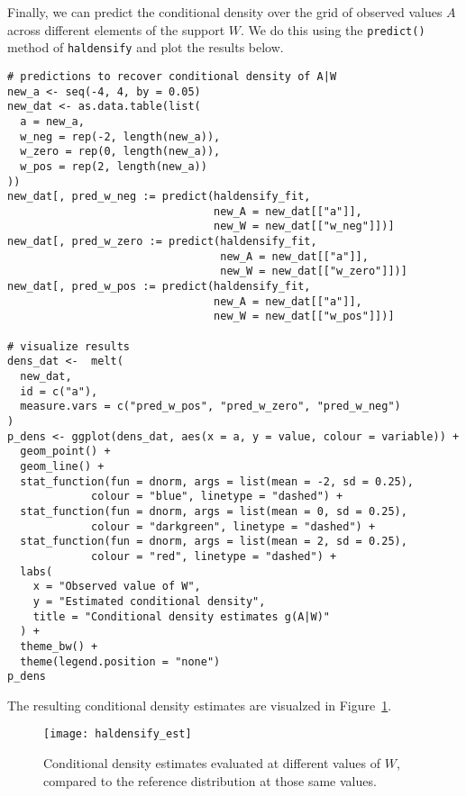 Finally, we can predict the conditional density over the grid of observed values
$A$ across different elements of the support $W$. We do this using the
\texttt{predict()} method of \texttt{haldensify} and plot the results below.

\begin{lstlisting}
# predictions to recover conditional density of A|W
new_a <- seq(-4, 4, by = 0.05)
new_dat <- as.data.table(list(
  a = new_a,
  w_neg = rep(-2, length(new_a)),
  w_zero = rep(0, length(new_a)),
  w_pos = rep(2, length(new_a))
))
new_dat[, pred_w_neg := predict(haldensify_fit,
                                new_A = new_dat[["a"]],
                                new_W = new_dat[["w_neg"]])]
new_dat[, pred_w_zero := predict(haldensify_fit,
                                 new_A = new_dat[["a"]],
                                 new_W = new_dat[["w_zero"]])]
new_dat[, pred_w_pos := predict(haldensify_fit,
                                new_A = new_dat[["a"]],
                                new_W = new_dat[["w_pos"]])]

# visualize results
dens_dat <-  melt(
  new_dat,
  id = c("a"),
  measure.vars = c("pred_w_pos", "pred_w_zero", "pred_w_neg")
)
p_dens <- ggplot(dens_dat, aes(x = a, y = value, colour = variable)) +
  geom_point() +
  geom_line() +
  stat_function(fun = dnorm, args = list(mean = -2, sd = 0.25),
             colour = "blue", linetype = "dashed") +
  stat_function(fun = dnorm, args = list(mean = 0, sd = 0.25),
             colour = "darkgreen", linetype = "dashed") +
  stat_function(fun = dnorm, args = list(mean = 2, sd = 0.25),
             colour = "red", linetype = "dashed") +
  labs(
    x = "Observed value of W",
    y = "Estimated conditional density",
    title = "Conditional density estimates g(A|W)"
  ) +
  theme_bw() +
  theme(legend.position = "none")
p_dens
\end{lstlisting}

The resulting conditional density estimates are visualzed in
Figure~\ref{fig:haldensify_est}.
\begin{figure}[H]
  \centering
  \texttt{[image: haldensify\_est]}
  \caption{Conditional density estimates evaluated at different values of $W$,
    compared to the reference distribution at those same values.}
  \label{fig:haldensify_est}
\end{figure}
